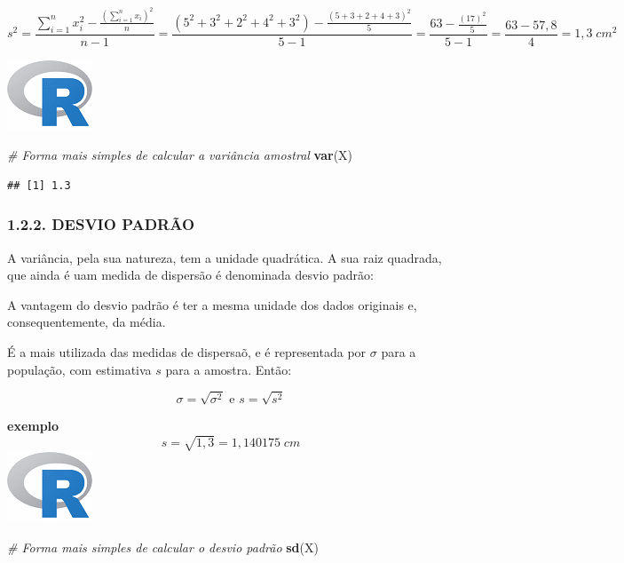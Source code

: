 \documentclass[
]{article}
\newenvironment{Shaded}{\begin{snugshade}}{\end{snugshade}}
\newcommand{\CommentTok}[1]{\textcolor[rgb]{0.56,0.35,0.01}{\textit{#1}}}
\newcommand{\KeywordTok}[1]{\textcolor[rgb]{0.13,0.29,0.53}{\textbf{#1}}}
\newcommand{\NormalTok}[1]{#1}
\begin{document}
\[
s^2 =\frac{\sum_{i=1}^nx_i^2-\frac{(\sum_{i=1}^n x_i)^2}{n}}{n-1} = \frac{(5^2+3^2+2^2+4^2+3^2)-\frac{(5+3+2+4+3)^2}{5}}{5-1} = \frac{63-\frac{(17)^2}{5}}{5-1} = \frac{63-57,8}{4}=1,3 \;cm^2
\]

\includegraphics{R.png}

\begin{Shaded}
\begin{Highlighting}[]
\CommentTok{# Forma mais simples de calcular a variância amostral}
\KeywordTok{var}\NormalTok{(X)}
\end{Highlighting}
\end{Shaded}

\begin{verbatim}
## [1] 1.3
\end{verbatim}

\hypertarget{desvio-padruxe3o}{%
\subsubsection{1.2.2. DESVIO PADRÃO}\label{desvio-padruxe3o}}

A variância, pela sua natureza, tem a unidade quadrática. A sua raiz
quadrada, que ainda é uam medida de dispersão é denominada desvio
padrão:

A vantagem do desvio padrão é ter a mesma unidade dos dados originais e,
consequentemente, da média.

É a mais utilizada das medidas de dispersaõ, e é representada por
\(\sigma\) para a população, com estimativa \(s\) para a amostra. Então:

\[
\sigma = \sqrt{\sigma^2} \text{   e    } s = \sqrt{s^2}
\]

\textbf{exemplo} \[
s = \sqrt{1,3} = 1,140175\;cm
\] \includegraphics{R.png}

\begin{Shaded}
\begin{Highlighting}[]
\CommentTok{# Forma mais simples de calcular o desvio padrão}
\KeywordTok{sd}\NormalTok{(X)}
\end{Highlighting}
\end{Shaded}
\end{document}
